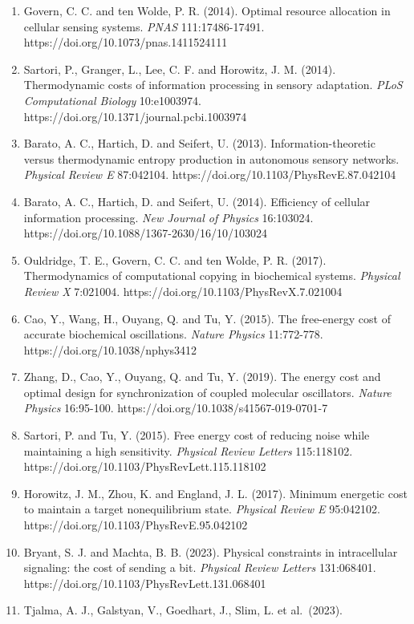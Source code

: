 \documentclass[
  10pt,
]{article}
\newcounter{none} %
\begin{document}
\begin{enumerate}
\item
  Govern, C. C. and ten Wolde, P. R. (2014). Optimal resource allocation
  in cellular sensing systems. \emph{PNAS} 111:17486-17491.
  https://doi.org/10.1073/pnas.1411524111
\item
  Sartori, P., Granger, L., Lee, C. F. and Horowitz, J. M. (2014).
  Thermodynamic costs of information processing in sensory adaptation.
  \emph{PLoS Computational Biology} 10:e1003974.
  https://doi.org/10.1371/journal.pcbi.1003974
\item
  Barato, A. C., Hartich, D. and Seifert, U. (2013).
  Information-theoretic versus thermodynamic entropy production in
  autonomous sensory networks. \emph{Physical Review E} 87:042104.
  https://doi.org/10.1103/PhysRevE.87.042104
\item
  Barato, A. C., Hartich, D. and Seifert, U. (2014). Efficiency of
  cellular information processing. \emph{New Journal of Physics}
  16:103024. https://doi.org/10.1088/1367-2630/16/10/103024
\item
  Ouldridge, T. E., Govern, C. C. and ten Wolde, P. R. (2017).
  Thermodynamics of computational copying in biochemical systems.
  \emph{Physical Review X} 7:021004.
  https://doi.org/10.1103/PhysRevX.7.021004
\item
  Cao, Y., Wang, H., Ouyang, Q. and Tu, Y. (2015). The free-energy cost
  of accurate biochemical oscillations. \emph{Nature Physics}
  11:772-778. https://doi.org/10.1038/nphys3412
\item
  Zhang, D., Cao, Y., Ouyang, Q. and Tu, Y. (2019). The energy cost and
  optimal design for synchronization of coupled molecular oscillators.
  \emph{Nature Physics} 16:95-100.
  https://doi.org/10.1038/s41567-019-0701-7
\item
  Sartori, P. and Tu, Y. (2015). Free energy cost of reducing noise
  while maintaining a high sensitivity. \emph{Physical Review Letters}
  115:118102. https://doi.org/10.1103/PhysRevLett.115.118102
\item
  Horowitz, J. M., Zhou, K. and England, J. L. (2017). Minimum energetic
  cost to maintain a target nonequilibrium state. \emph{Physical Review
  E} 95:042102. https://doi.org/10.1103/PhysRevE.95.042102
\item
  Bryant, S. J. and Machta, B. B. (2023). Physical constraints in
  intracellular signaling: the cost of sending a bit. \emph{Physical
  Review Letters} 131:068401.
  https://doi.org/10.1103/PhysRevLett.131.068401
\item
  Tjalma, A. J., Galstyan, V., Goedhart, J., Slim, L. et al.~(2023).

\end{enumerate}
\end{document}
